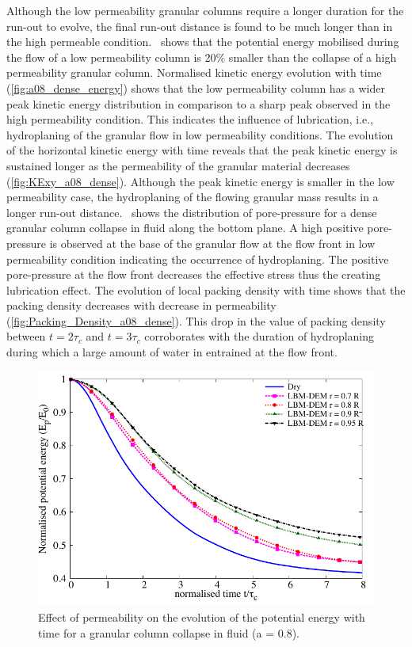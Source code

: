\documentclass[12pt,a4paper,twocolumn,fleqn]{narms}
\begin{document}
Although the low permeability granular columns require a longer duration for 
the run-out to evolve, the final run-out distance is found to be much longer 
than in the high permeable condition.~ shows that the 
potential energy mobilised during the flow of a low permeability column is 20\% 
smaller than the collapse of a high permeability granular column. Normalised 
kinetic energy evolution with time (\cref{fig:a08_dense_energy}) shows that the 
low permeability column has a wider peak kinetic energy distribution in 
comparison to a sharp peak observed in the high permeability condition. This 
indicates the influence of lubrication, i.e., hydroplaning of the granular flow 
in low permeability conditions. The evolution of the horizontal kinetic energy 
with time reveals that the peak kinetic energy is sustained longer as the 
permeability of the granular material decreases (\cref{fig:KExy_a08_dense}). 
Although the peak kinetic energy is smaller in the low permeability case, the 
hydroplaning of the flowing granular mass results in a longer run-out 
distance.~ shows the 
distribution of pore-pressure for a dense granular column collapse in fluid 
along the bottom plane. A high positive pore-pressure is observed 
at the base of the granular flow at the flow front in low permeability 
condition indicating the occurrence of hydroplaning. The positive pore-pressure 
at the flow front decreases the effective stress thus the creating lubrication 
effect. The evolution of local packing density with time shows that the packing 
density decreases with decrease in permeability 
(\cref{fig:Packing_Density_a08_dense}). This drop 
in the value of packing density between $t = 2\tau_c$ and $t=3\tau_c$ 
corroborates with the duration of hydroplaning during which a large amount of 
water in entrained at the flow front.

\begin{figure}
	\centering
    \includegraphics[width=0.7\linewidth]{figs/PE_a08_dense}
    \caption{Effect of permeability on the evolution of the potential energy 
    with time for a granular column collapse in fluid (a = 0.8).}
    \label{fig:PE_a08_dense}
\end{figure}
\end{document}
